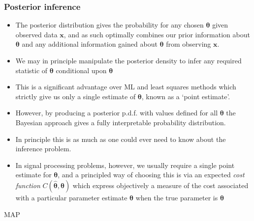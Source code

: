 \documentclass[12pt]{article}
\newcommand{\thetab}{\boldsymbol{\theta}}
\newcommand{\prethe}{\hat{\thetab}}
\newcommand{\xb}{\mathbf{x}}
\begin{document}
\subsubsection{Posterior inference}
\begin{itemize}
    \item The posterior distribution gives the probability for any chosen $\thetab$ given observed data  $\xb$, and as such optimally combines our prior information about $\thetab$ and any additional information gained about $\thetab$ from observing $\xb$.
    \item We may in principle manipulate the posterior density to infer any required statistic of $\thetab$ conditional upon $\thetab$
    \item This is a significant advantage over ML and least squares methods which strictly give us only a single estimate of $\thetab$, known as a `point estimate'.
    \item However, by producing a posterior p.d.f. with values defined for all $\thetab$ the Bayesian approach gives a fully interpretable probability distribution.
    \item In principle this is as much as one could ever need to know about the inference problem.
    \item In signal processing problems, however, we usually require a single point estimate for $\thetab$, and a principled way of choosing this is via an expected \textit{cost function} $C(\prethe , \thetab)$ which express objectively a measure of the cost associated with a particular parameter estimate $\prethe$ when the true parameter is $\thetab$
\end{itemize}
MAP 
\end{document}
